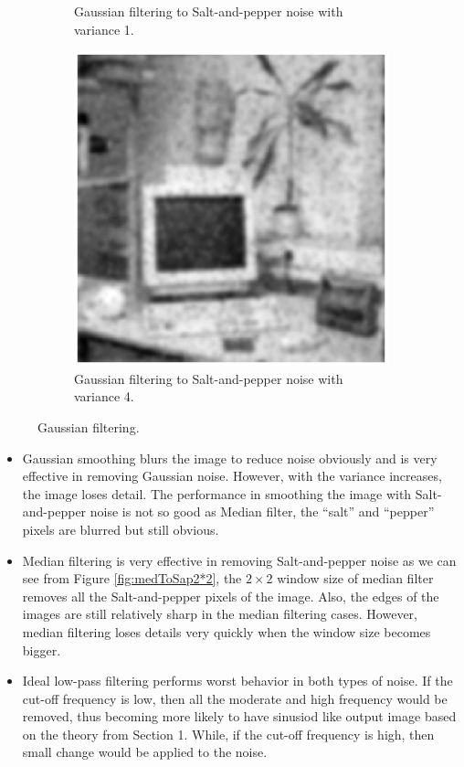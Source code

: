 \documentclass[11pt,a4paper]{article}
\begin{document}
\begin{itemize}
\begin{figure}[!ht]
\begin{subfigure}[t]{.32\linewidth}
			\caption{\scriptsize Gaussian filtering to Salt-and-pepper noise with variance 1.}
			\label{fig:gaussToSap1}
		\end{subfigure}
		\begin{subfigure}[t]{.32\linewidth} %
			\includegraphics[width=\columnwidth]{Q17_Gauss_to_Sap_4.eps}
			\caption{\scriptsize Gaussian filtering to Salt-and-pepper noise with variance 4.}
			\label{fig:gaussToSap4}
		\end{subfigure}

		\caption{Gaussian filtering.}
		\label{fig:gauss}
	\end{figure}
	
	\begin{itemize}
		\item Gaussian smoothing blurs the image to reduce noise obviously and is very effective in removing Gaussian noise. However, with the variance increases, the image loses detail. The performance in smoothing the image with Salt-and-pepper noise is not so good as Median filter, the ``salt'' and ``pepper'' pixels are blurred but still obvious.
		\item Median filtering is very effective in removing Salt-and-pepper noise as we can see from Figure \ref{fig:medToSap2*2}, the $2\times 2$ window size of median filter removes all the Salt-and-pepper pixels of the image. Also, the edges of the images are still relatively sharp in the median filtering cases. However, median filtering loses details very quickly when the window size becomes bigger.
		\item Ideal low-pass filtering performs worst behavior in both types of noise. If the cut-off frequency is low, then all the moderate and high frequency would be removed, thus becoming more likely to have sinusiod like output image based on the theory from Section 1. While, if the cut-off frequency is high, then small change would be applied to the noise.
	\end{itemize}


\end{itemize}
\end{document}
